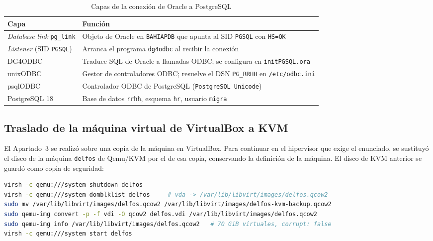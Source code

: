 \begin{table}[!htbp]
    \centering
    \begin{tabularx}{\textwidth}{L{3.8cm} Y}
        \toprule
        \textbf{Capa} & \textbf{Función} \\
        \midrule
        \textit{Database link} \texttt{pg\_link} & Objeto de Oracle en \texttt{BAHIAPDB} que apunta al SID \texttt{PGSQL} con \texttt{HS=OK} \\
        \textit{Listener} (SID \texttt{PGSQL}) & Arranca el programa \texttt{dg4odbc} al recibir la conexión \\
        DG4ODBC & Traduce SQL de Oracle a llamadas ODBC; se configura en \texttt{initPGSQL.ora} \\
        unixODBC & Gestor de controladores ODBC; resuelve el DSN \texttt{PG\_RRHH} en \texttt{/etc/odbc.ini} \\
        psqlODBC & Controlador ODBC de PostgreSQL (\texttt{PostgreSQL Unicode}) \\
        PostgreSQL 18 & Base de datos \texttt{rrhh}, esquema \texttt{hr}, usuario \texttt{migra} \\
        \bottomrule
    \end{tabularx}
    \caption{Capas de la conexión de Oracle a PostgreSQL}
    \label{tab:capas4}
\end{table}

\subsection{Traslado de la máquina virtual de VirtualBox a KVM}
\label{sec:migracionvm}

El Apartado~3 se realizó sobre una copia de la máquina en VirtualBox. Para continuar en el hipervisor que exige el enunciado, se sustituyó el disco de la máquina \texttt{delfos} de Qemu/KVM por el de esa copia, conservando la definición de la máquina. El disco de KVM anterior se guardó como copia de seguridad:

\begin{lstlisting}[language=bash]
virsh -c qemu:///system shutdown delfos
virsh -c qemu:///system domblklist delfos     # vda -> /var/lib/libvirt/images/delfos.qcow2
sudo mv /var/lib/libvirt/images/delfos.qcow2 /var/lib/libvirt/images/delfos-kvm-backup.qcow2
sudo qemu-img convert -p -f vdi -O qcow2 delfos.vdi /var/lib/libvirt/images/delfos.qcow2
sudo qemu-img info /var/lib/libvirt/images/delfos.qcow2   # 70 GiB virtuales, corrupt: false
virsh -c qemu:///system start delfos
\end{lstlisting}

